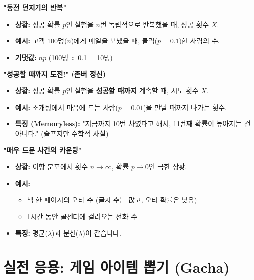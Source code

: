\documentclass[11pt,a4paper]{book}
\theoremstyle{definition}
\begin{document}
\begin{storybox}[title={1. 베르누이 \& 이항 분포 (Binomial)}]
\textbf{"동전 던지기의 반복"}
\begin{itemize}
    \item \textbf{상황:} 성공 확률 $p$인 실험을 $n$번 독립적으로 반복했을 때, 성공 횟수 $X$.
    \item \textbf{예시:} 고객 100명($n$)에게 메일을 보냈을 때, 클릭($p=0.1$)한 사람의 수.
    \item \textbf{기댓값:} $np$ (100명 $\times$ 0.1 = 10명)
\end{itemize}
\end{storybox}

\begin{storybox}[title={2. 기하 분포 (Geometric)}]
\textbf{"성공할 때까지 도전!" (존버 정신)}
\begin{itemize}
    \item \textbf{상황:} 성공 확률 $p$인 실험을 \textbf{성공할 때까지} 계속할 때, 시도 횟수 $X$.
    \item \textbf{예시:} 소개팅에서 마음에 드는 사람($p=0.01$)을 만날 때까지 나가는 횟수.
    \item \textbf{특징 (Memoryless):} "지금까지 10번 차였다고 해서, 11번째 확률이 높아지는 건 아니다." (슬프지만 수학적 사실)
\end{itemize}
\end{storybox}

\begin{storybox}[title={3. 포아송 분포 (Poisson)}]
\textbf{"매우 드문 사건의 카운팅"}
\begin{itemize}
    \item \textbf{상황:} 이항 분포에서 횟수 $n \to \infty$, 확률 $p \to 0$인 극한 상황.
    \item \textbf{예시:} 
    \begin{itemize}
        \item 책 한 페이지의 오타 수 (글자 수는 많고, 오타 확률은 낮음)
        \item 1시간 동안 콜센터에 걸려오는 전화 수
    \end{itemize}
    \item \textbf{특징:} 평균($\lambda$)과 분산($\lambda$)이 같습니다.
\end{itemize}
\end{storybox}

\section{실전 응용: 게임 아이템 뽑기 (Gacha)}
\end{document}
